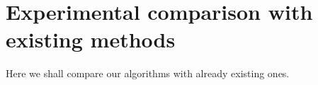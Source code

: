 \chapter{Experimental comparison with existing methods}

Here we shall compare our algorithms with already existing ones.